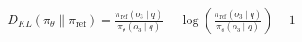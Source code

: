 \documentclass[preview]{standalone}
\begin{document}
\begin{align*}
D_{KL}(\pi_\theta \parallel \pi_{\text{ref}}) = \frac{\pi_{\text{ref}}(o_3 \mid q)}{\pi_\theta(o_3 \mid q)} - \log\left(\frac{\pi_{\text{ref}}(o_3 \mid q)}{\pi_\theta(o_3 \mid q)}\right) - 1
\end{align*}
\end{document}
